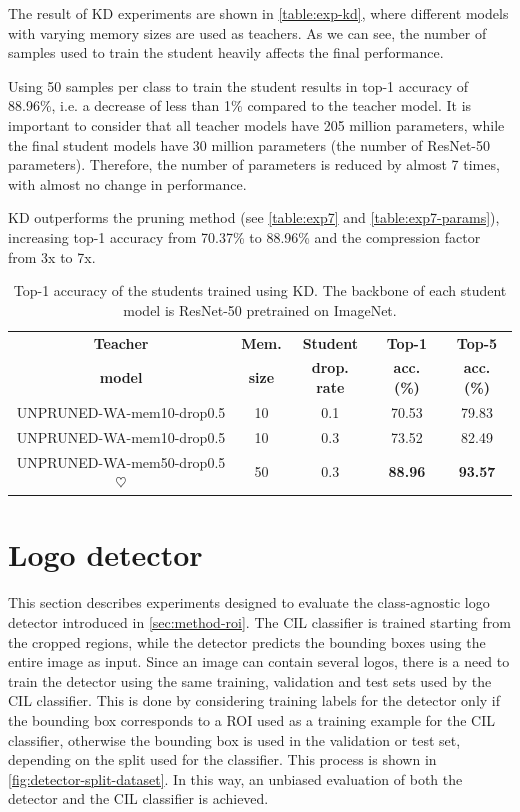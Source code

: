The result of KD experiments are shown in \autoref{table:exp-kd}, where different models with varying memory sizes are used as teachers. As we can see, the number of samples used to train the student heavily affects the final performance.

Using 50 samples per class to train the student results in top-1 accuracy of 88.96\%, i.e. a decrease of less than 1\% compared to the teacher model.
It is important to consider that all teacher models have 205 million parameters, while the final student models have 30 million parameters (the number of ResNet-50 parameters).
Therefore, the number of parameters is reduced by almost 7 times, with almost no change in performance.

KD outperforms the pruning method (see \autoref{table:exp7} and \autoref{table:exp7-params}), increasing top-1 accuracy from 70.37\% to 88.96\% and the compression factor from 3x to 7x.

\begin{table}[H]
    \centering
    \begin{tabular}{c|c|c|c|c}
        \hline
        \textbf{Teacher} &
        \textbf{Mem.} &
        \textbf{Student} &
        \textbf{Top-1}  &
        \textbf{Top-5} \\
        \textbf{model} &
        \textbf{size} &
        \textbf{drop. rate} &
        \textbf{acc. (\%)}  &
        \textbf{acc. (\%)} \\
        \hline
        \hline
UNPRUNED-WA-mem10-drop0.5&10&0.1&70.53&79.83\\
UNPRUNED-WA-mem10-drop0.5&10&0.3&73.52&82.49\\
UNPRUNED-WA-mem50-drop0.5 $\heartsuit$ &50&0.3&\textbf{88.96}&\textbf{93.57}\\
\hline
\end{tabular}
\caption{Top-1 accuracy of the students trained using KD. The backbone of each student model is ResNet-50 pretrained on ImageNet.}
    \label{table:exp-kd}
\end{table}


\section{Logo detector}
\label{sec:exp-det}
This section describes experiments designed to evaluate the class-agnostic logo detector introduced in \autoref{sec:method-roi}.
The CIL classifier is trained starting from the cropped regions, while the detector predicts the bounding boxes using the entire image as input.
Since an image can contain several logos, there is a need to train the detector using the same training, validation and test sets used by the CIL classifier.
This is done by considering training labels for the detector only if the bounding box corresponds to a ROI used as a training example for the CIL classifier, otherwise the bounding box is used in the validation or test set, depending on the split used for the classifier.
This process is shown in \autoref{fig:detector-split-dataset}.
In this way, an unbiased evaluation of both the detector and the CIL classifier is achieved.


